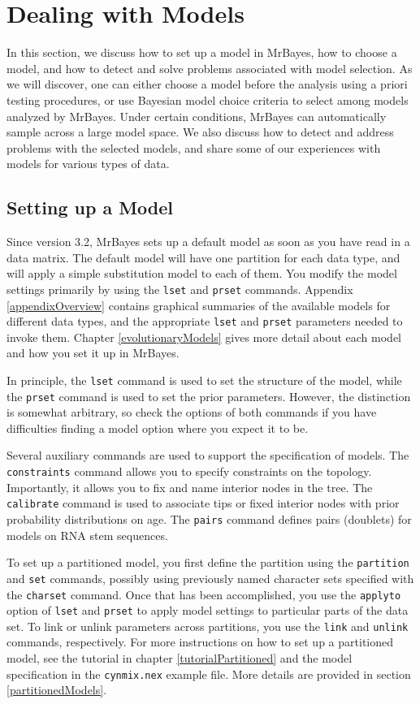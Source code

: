 \documentclass[12pt]{book}
\newcommand{\ttt}[1]{\texttt{#1}}
\begin{document}
\section{Dealing with Models}

In this section, we discuss how to set up a model in MrBayes, how to choose a model, and how to
detect and solve problems associated with model selection. As we will discover, one can either
choose a model before the analysis using a priori testing procedures, or use Bayesian model choice
criteria to select among models analyzed by MrBayes. Under certain conditions, MrBayes can
automatically sample across a large model space. We also discuss how to detect and address problems
with the selected models, and share some of our experiences with models for various types of data.

\subsection{Setting up a Model}

Since version 3.2, MrBayes sets up a default model as soon as you have read in a data matrix. The
default model will have one partition for each data type, and will apply a simple substitution
model to each of them. You modify the model settings primarily by using the \ttt{lset} and
\ttt{prset} commands. Appendix \ref{appendixOverview} contains graphical summaries of the available
models for different data types, and the appropriate \ttt{lset} and \ttt{prset} parameters needed
to invoke them. Chapter \ref{evolutionaryModels} gives more detail about each model and how you set
it up in MrBayes.

In principle, the \ttt{lset} command is used to set the structure of the model, while the
\ttt{prset} command is used to set the prior parameters. However, the distinction is somewhat
arbitrary, so check the options of both commands if you have difficulties finding a model option
where you expect it to be.

Several auxiliary commands are used to support the specification of models. The \ttt{constraints}
command allows you to specify constraints on the topology. Importantly, it allows you to fix and
name interior nodes in the tree. The \ttt{calibrate} command is used to associate tips or fixed
interior nodes with prior probability distributions on age. The \ttt{pairs} command defines pairs
(doublets) for models on RNA stem sequences.

To set up a partitioned model, you first define the partition using the \ttt{partition} and
\ttt{set} commands, possibly using previously named character sets specified with the \ttt{charset}
command. Once that has been accomplished, you use the \ttt{applyto} option of \ttt{lset} and
\ttt{prset} to apply model settings to particular parts of the data set. To link or unlink
parameters across partitions, you use the \ttt{link} and \ttt{unlink} commands, respectively. For
more instructions on how to set up a partitioned model, see the tutorial in chapter
\ref{tutorialPartitioned} and the model specification in the \ttt{cynmix.nex} example file. More
details are provided in section \ref{partitionedModels}.
\end{document}
